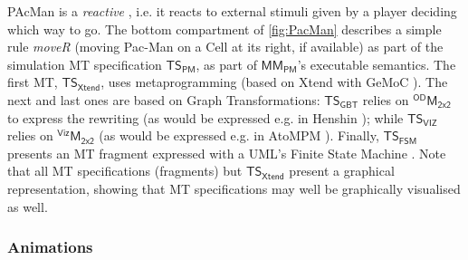 PAcMan is a \emph{reactive} \DSL, i.e. it reacts to external stimuli given by a 
player deciding which way to go. 
The bottom compartment of \autoref{fig:PacMan} describes a simple rule 
\emph{\textsf{moveR}} (moving Pac-Man on a \textsf{Cell} at its right, if 
available) as part of the simulation MT specification $\mathsf{TS}_{\mathsf{PM}}$,
as part of $\mathsf{MM}_{\mathsf{PM}}$'s executable semantics. 
The first MT, $\mathsf{TS}_{\mathsf{Xtend}}$, uses metaprogramming 
(based on Xtend with GeMoC \cite{Leroy-Bousse-etAl:2017}). The next and last ones
are based on Graph Transformations: $\mathsf{TS}_{\mathsf{GBT}}$ relies on 
$^{\mathsf{OD}}\mathsf{M}_{\mathsf{2x2}}$ to express the rewriting (as would be 
expressed e.g. in Henshin \cite{Bill-Gabmeyer-Kaufmann-Seidl:2014}); 
while $\mathsf{TS}_{\mathsf{VIZ}}$ relies on $^{\mathsf{Viz}}\mathsf{M}_{\mathsf{2x2}}$
(as would be expressed e.g. in AtoMPM \cite{J:SyrianiVangheluwe:2013}). 
Finally, $\mathsf{TS}_{\mathsf{FSM}}$ presents an MT fragment expressed with 
a UML's Finite State Machine \cite{B:Rumbaugh-Jacobson-Booch:2004}. 
Note that all MT specifications (fragments) but $\mathsf{TS}_{\mathsf{Xtend}}$ 
present a graphical representation, showing that MT specifications may well be 
graphically visualised as well.

\subsubsection{Animations}
\label{sec:Examples:PacMan:Animations}

